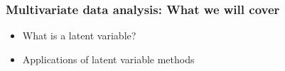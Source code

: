 \begin{frame}\frametitle{Multivariate data analysis: What we will cover}
	\begin{itemize}
		\item	What is a latent variable?
		\item	Applications of latent variable methods
	\end{itemize}
\end{frame}

%

